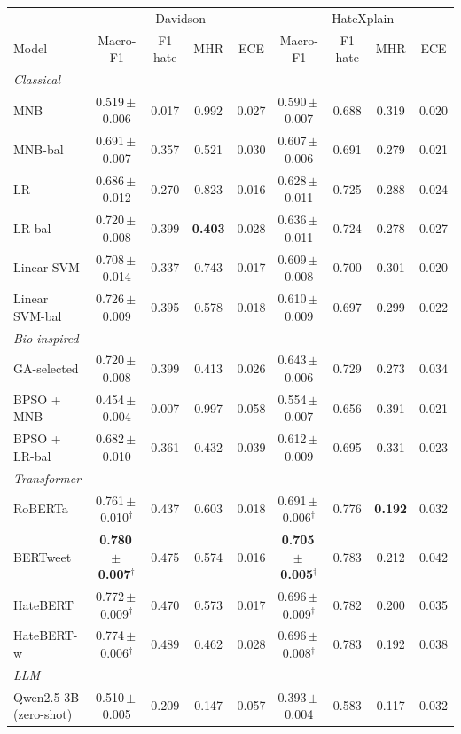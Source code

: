 \begin{tabular}{l|cccc|cccc}
\toprule
 & \multicolumn{4}{c|}{Davidson} & \multicolumn{4}{c}{HateXplain} \\
Model & Macro-F1 & F1 hate & MHR & ECE & Macro-F1 & F1 hate & MHR & ECE \\
\midrule
\multicolumn{9}{l}{\textit{Classical}} \\
MNB & 0.519\,$\pm$\,0.006 & 0.017 & 0.992 & 0.027 & 0.590\,$\pm$\,0.007 & 0.688 & 0.319 & 0.020 \\
MNB-bal & 0.691\,$\pm$\,0.007 & 0.357 & 0.521 & 0.030 & 0.607\,$\pm$\,0.006 & 0.691 & 0.279 & 0.021 \\
LR & 0.686\,$\pm$\,0.012 & 0.270 & 0.823 & 0.016 & 0.628\,$\pm$\,0.011 & 0.725 & 0.288 & 0.024 \\
LR-bal & 0.720\,$\pm$\,0.008 & 0.399 & \textbf{0.403} & 0.028 & 0.636\,$\pm$\,0.011 & 0.724 & 0.278 & 0.027 \\
Linear SVM & 0.708\,$\pm$\,0.014 & 0.337 & 0.743 & 0.017 & 0.609\,$\pm$\,0.008 & 0.700 & 0.301 & 0.020 \\
Linear SVM-bal & 0.726\,$\pm$\,0.009 & 0.395 & 0.578 & 0.018 & 0.610\,$\pm$\,0.009 & 0.697 & 0.299 & 0.022 \\
\midrule
\multicolumn{9}{l}{\textit{Bio-inspired}} \\
GA-selected & 0.720\,$\pm$\,0.008 & 0.399 & 0.413 & 0.026 & 0.643\,$\pm$\,0.006 & 0.729 & 0.273 & 0.034 \\
BPSO + MNB & 0.454\,$\pm$\,0.004 & 0.007 & 0.997 & 0.058 & 0.554\,$\pm$\,0.007 & 0.656 & 0.391 & 0.021 \\
BPSO + LR-bal & 0.682\,$\pm$\,0.010 & 0.361 & 0.432 & 0.039 & 0.612\,$\pm$\,0.009 & 0.695 & 0.331 & 0.023 \\
\midrule
\multicolumn{9}{l}{\textit{Transformer}} \\
RoBERTa & 0.761\,$\pm$\,0.010$^{\dagger}$ & 0.437 & 0.603 & 0.018 & 0.691\,$\pm$\,0.006$^{\dagger}$ & 0.776 & \textbf{0.192} & 0.032 \\
BERTweet & \textbf{0.780\,$\pm$\,0.007}$^{\dagger}$ & 0.475 & 0.574 & 0.016 & \textbf{0.705\,$\pm$\,0.005}$^{\dagger}$ & 0.783 & 0.212 & 0.042 \\
HateBERT & 0.772\,$\pm$\,0.009$^{\dagger}$ & 0.470 & 0.573 & 0.017 & 0.696\,$\pm$\,0.009$^{\dagger}$ & 0.782 & 0.200 & 0.035 \\
HateBERT-w & 0.774\,$\pm$\,0.006$^{\dagger}$ & 0.489 & 0.462 & 0.028 & 0.696\,$\pm$\,0.008$^{\dagger}$ & 0.783 & 0.192 & 0.038 \\
\midrule
\multicolumn{9}{l}{\textit{LLM}} \\
Qwen2.5-3B (zero-shot) & 0.510\,$\pm$\,0.005 & 0.209 & 0.147 & 0.057 & 0.393\,$\pm$\,0.004 & 0.583 & 0.117 & 0.032 \\
\bottomrule
\end{tabular}
